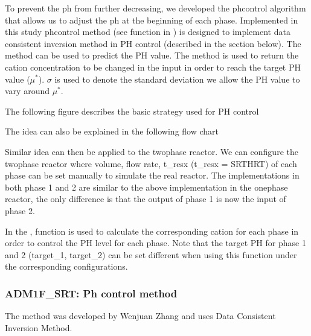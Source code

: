 \documentclass[a4paper,10pt,english]{sphinxmanual}
\let\sphinxpxdimen\pdfpxdimen\else\newdimen\sphinxpxdimen
\begin{document}
\sphinxAtStartPar
To prevent the ph from further decreasing, we developed the ph\sphinxhyphen{}control algorithm that allows us to adjust the ph at the beginning of each phase.
Implemented in this study ph\sphinxhyphen{}control method (see  function in  ) is designed to implement data consistent inversion method in PH control (described in the section below). The  method can be used to predict the PH value. The  method is used to return the cation concentration to be changed in the input in order to reach the target PH value (\(\mu^*\)). \(\sigma\) is used to denote the standard deviation we allow the PH value to vary around \(\mu^*\).

\sphinxAtStartPar
The following figure describes the basic strategy used for PH control

\noindent\sphinxincludegraphics[width=559\sphinxpxdimen,height=416\sphinxpxdimen]{{phcontrol}.png}

\sphinxAtStartPar
The idea can also be explained in the following flow chart

\noindent\sphinxincludegraphics[width=1520\sphinxpxdimen,height=1140\sphinxpxdimen]{{flow1}.png}

\sphinxAtStartPar
Similar idea can then be applied to the two\sphinxhyphen{}phase reactor. We can configure the two\sphinxhyphen{}phase reactor where volume, flow rate, t\_resx (t\_resx = SRT\sphinxhyphen{}HRT) of each phase can be set manually to simulate the real reactor. The implementations in both phase 1 and 2 are similar to the above implementation in the one\sphinxhyphen{}phase reactor, the only difference is that the output of phase 1 is now the input of phase 2.

\sphinxAtStartPar
In the {\hyperref[\detokenize{jupyter_notebook/ph-control::doc}]{}},  function is used to calculate the corresponding cation for each phase in order to control the PH level for each phase. Note that the target PH for phase 1 and 2 (target\_1, target\_2) can be set different when using this function under the corresponding configurations.


\subsubsection{ADM1F\_SRT: Ph control method}
\label{\detokenize{jupyter_notebook/ph-control:ADM1F_SRT:-Ph-control-method}}\label{\detokenize{jupyter_notebook/ph-control::doc}}
\sphinxAtStartPar
The  method was developed by Wenjuan Zhang and uses Data Consistent Inversion Method.
\end{document}
